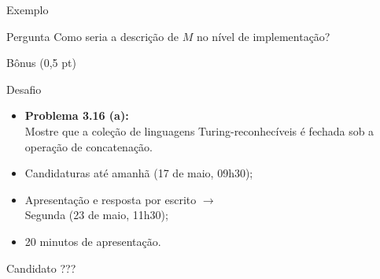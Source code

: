 \documentclass[xcolor=dvipsnames,table]{beamer}
\begin{document}
	\begin{frame}{Exemplo}
		\begin{block}{Pergunta}
			Como seria a descrição de $M$ no nível de implementação?
		\end{block}
	\end{frame}
	
	\begin{frame}{Bônus (0,5 pt)}
		\begin{block}{Desafio}
			\begin{itemize}
				\item {\bf Problema 3.16 (a):} \\Mostre que a coleção de linguagens Turing-reconhecíveis é fechada sob a operação de concatenação.
                \item Candidaturas até amanhã (17 de maio, 09h30); 
                \item Apresentação e resposta por escrito $\rightarrow$ \\Segunda (23 de maio, 11h30); 
                \item 20 minutos de apresentação.
			\end{itemize}
		\end{block} 
        \begin{block}{Candidato}
        	???
        \end{block}
	\end{frame}
	
	\begin{frame}
		\titlepage
	\end{frame}
	
\end{document}
